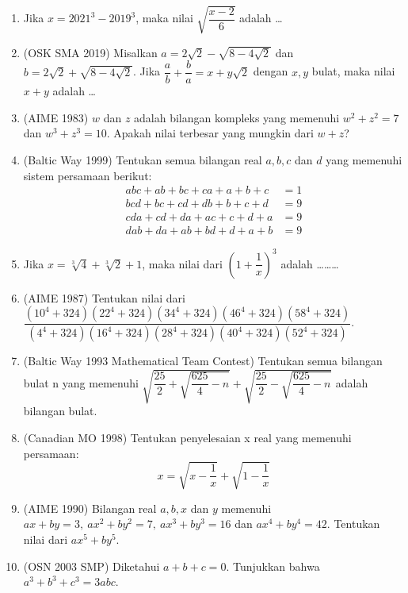 \documentclass[12pt]{scrartcl}
\begin{document}
\begin{enumerate}
    \item Jika $x=2021^3-2019^3$, maka nilai $\sqrt{\dfrac{x-2}{6}}$ adalah \dots

    \item (OSK SMA 2019) Misalkan $a = 2\sqrt{2} - \sqrt{8-4\sqrt{2}}$ dan $b = 2\sqrt{2} + \sqrt{8-4\sqrt{2}}$. Jika $\dfrac{a}{b}+\dfrac{b}{a}=x+y\sqrt{2}$ dengan $x,y$ bulat, maka nilai $x+y$ adalah \dots
    
    \item (AIME 1983) $w$ dan $z$ adalah bilangan kompleks yang memenuhi $w^2+z^2=7$ dan $w^3+z^3=10$. Apakah nilai terbesar yang mungkin dari $w+z$?

    \item (Baltic Way 1999) Tentukan semua bilangan real $a, b, c$ dan $d$ yang memenuhi sistem persamaan berikut:
    \begin{align*}
        abc+ab+bc+ca+a+b+c &= 1 \\
        bcd+bc+cd+db+b+c+d &= 9 \\
        cda+cd+da+ac+c+d+a &= 9 \\
        dab+da+ab+bd+d+a+b &= 9
    \end{align*}

    \item Jika $x=\sqrt[3]{4}+\sqrt[3]{2}+1$, maka nilai dari $(1+\dfrac{1}{x})^3$ adalah \dots\dots\dots

    \item (AIME 1987) Tentukan nilai dari $\dfrac{(10^4+324)(22^4+324)(34^4+324)(46^4+324)(58^4+324)}{(4^4+324)(16^4+324)(28^4+324)(40^4+324)(52^4+324)}$.

    \item (Baltic Way 1993 Mathematical Team Contest) Tentukan semua bilangan bulat n yang memenuhi $\sqrt{\dfrac{25}{2}+\sqrt{\dfrac{625}{4}-n}} + \sqrt{\dfrac{25}{2}-\sqrt{\dfrac{625}{4}-n}}$ adalah bilangan bulat.

    \item (Canadian MO 1998) Tentukan penyelesaian x real yang memenuhi persamaan:
    \[ x = \sqrt{x-\dfrac{1}{x}} + \sqrt{1-\dfrac{1}{x}} \]

    \item (AIME 1990) Bilangan real $a, b, x$ dan $y$ memenuhi $ax+by=3, \ ax^2+by^2=7, \ ax^3+by^3=16$ dan $ax^4+by^4=42$. Tentukan nilai dari $ax^5+by^5$.

    \item (OSN 2003 SMP) Diketahui $a+b+c=0$. Tunjukkan bahwa $a^3+b^3+c^3=3abc$.

\end{enumerate}
\end{document}
